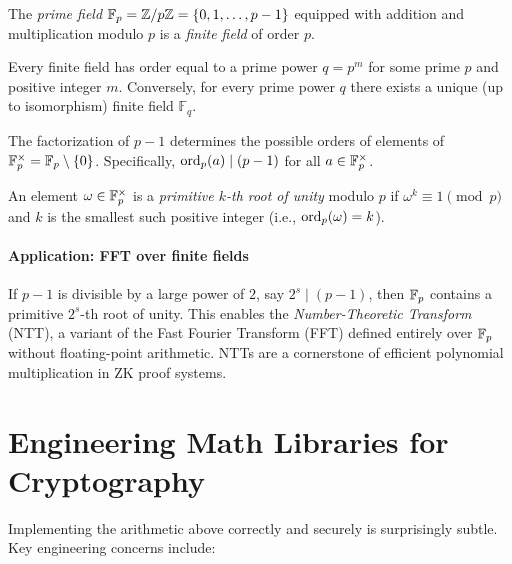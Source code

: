 \documentclass[11pt]{article}
\begin{document}
\begin{definition}
  The \emph{prime field} $\mathbb{F}_p = \mathbb{Z}/p\mathbb{Z} = \{0, 1, \ldots, p-1\}$
  equipped with addition and multiplication modulo $p$ is a
  \emph{finite field} of order $p$.
\end{definition}

\begin{fact}
  Every finite field has order equal to a prime power $q = p^m$ for
  some prime $p$ and positive integer $m$.  Conversely, for every
  prime power $q$ there exists a unique (up to isomorphism) finite
  field $\mathbb{F}_q$.
\end{fact}

\begin{fact}
  The factorization of $p - 1$ determines the possible orders of
  elements of $\mathbb{F}_p^{\times} = \mathbb{F}_p \setminus \{0\}$.  Specifically,
  $\operatorname{ord}_p(a) \mid (p-1)$ for all $a \in \mathbb{F}_p^{\times}$.
\end{fact}

\begin{definition}
  An element $\omega \in \mathbb{F}_p^{\times}$ is a \emph{primitive $k$-th
  root of unity} modulo $p$ if $\omega^k \equiv 1 \pmod{p}$ and $k$
  is the smallest such positive integer (i.e., $\operatorname{ord}_p(\omega) = k$).
\end{definition}

\paragraph{Application: FFT over finite fields}
If $p - 1$ is divisible by a large power of $2$, say $2^s \mid (p-1)$,
then $\mathbb{F}_p$ contains a primitive $2^s$-th root of unity.  This enables
the \emph{Number-Theoretic Transform} (NTT), a variant of the Fast
Fourier Transform (FFT) defined entirely over $\mathbb{F}_p$ without floating-point
arithmetic.  NTTs are a cornerstone of efficient polynomial multiplication
in ZK proof systems.

\section{Engineering Math Libraries for Cryptography}

Implementing the arithmetic above correctly and securely is surprisingly
subtle.  Key engineering concerns include:
\end{document}
